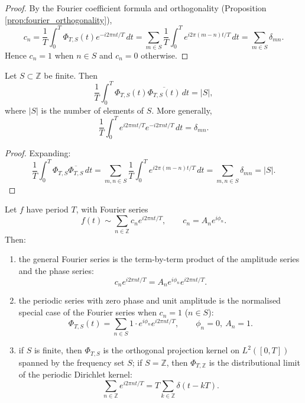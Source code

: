\begin{proof}
By the Fourier coefficient formula and orthogonality (Proposition \ref{prop:fourier_orthogonality}),
\[
c_n=\frac{1}{T}\int_0^T \Phi_{T,S}(t)e^{-i2\pi n t/T}\,dt
=\sum_{m\in S}\frac{1}{T}\int_0^T e^{i2\pi (m-n)t/T}\,dt
=\sum_{m\in S}\delta_{mn}.
\]
Hence $c_n=1$ when $n\in S$ and $c_n=0$ otherwise.
\end{proof}

\begin{lemma}\label{lem:unit_phase_zero_orthogonality}
Let $S\subset \mathbb{Z}$ be finite. Then
\[
\frac{1}{T}\int_0^T \Phi_{T,S}(t)\overline{\Phi_{T,S}(t)}\,dt = |S|,
\]
where $|S|$ is the number of elements of $S$. More generally,
\[
\frac{1}{T}\int_0^T e^{i2\pi m t/T}e^{-i2\pi n t/T}\,dt=\delta_{mn}.
\]
\end{lemma}

\begin{proof}
Expanding:
\[
\frac{1}{T}\int_0^T \Phi_{T,S}\overline{\Phi_{T,S}}\,dt
=\sum_{m,n\in S}\frac{1}{T}\int_0^T e^{i2\pi (m-n)t/T}\,dt
=\sum_{m,n\in S}\delta_{mn}=|S|.
\]
\end{proof}

\begin{theorem}\label{thm:unit_phase_zero_fourier_relation}
Let $f$ have period $T$, with Fourier series
\[
f(t)\sim \sum_{n\in\mathbb{Z}} c_n e^{i2\pi n t/T},
\qquad c_n=A_n e^{i\phi_n}.
\]
Then:
\begin{enumerate}[label=(\roman*)]
    \item the general Fourier series is the term-by-term product of the amplitude series and the phase series:
    \[
    c_n e^{i2\pi n t/T}
    = A_n e^{i\phi_n}e^{i2\pi n t/T}.
    \]
    \item the periodic series with zero phase and unit amplitude is the normalised special case of the Fourier series when $c_n=1$ ($n\in S$):
    \[
    \Phi_{T,S}(t)=\sum_{n\in S}1\cdot e^{i\phi_n}e^{i2\pi n t/T},
    \qquad \phi_n=0,\ A_n=1.
    \]
    \item if $S$ is finite, then $\Phi_{T,S}$ is the orthogonal projection kernel on $L^2([0,T])$ spanned by the frequency set $S$; if $S=\mathbb{Z}$, then $\Phi_{T,\mathbb{Z}}$ is the distributional limit of the periodic Dirichlet kernel:
    \[
    \sum_{n\in\mathbb{Z}}e^{i2\pi n t/T}
    = T\sum_{k\in\mathbb{Z}}\delta(t-kT).
    \]
\end{enumerate}
\end{theorem}


